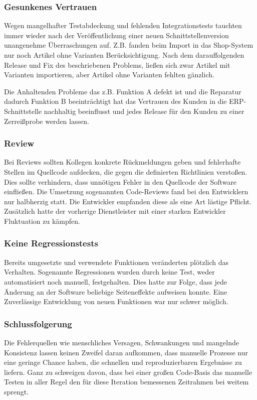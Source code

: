 \subsubsection{Gesunkenes Vertrauen}
Wegen mangelhafter Testabdeckung und fehlenden Integrationstests tauchten immer wieder nach der Veröffentlichung einer neuen Schnittstellenversion unangenehme Überraschungen auf. Z.B. fanden beim Import in das Shop-System nur noch Artikel ohne Varianten Berücksichtigung. Nach dem darauffolgenden Release und Fix des beschriebenen Problems, ließen sich zwar Artikel mit Varianten importieren, aber Artikel ohne Varianten fehlten gänzlich.

Die Anhaltenden Probleme das z.B. Funktion A defekt ist und die Reparatur dadurch Funktion B beeinträchtigt hat das Vertrauen des Kunden in die ERP-Schnittstelle nachhaltig beeinflusst und jedes Release für den Kunden zu einer Zerreißprobe werden lassen. 

\subsubsection{Review}
Bei Reviews sollten Kollegen konkrete Rückmeldungen geben und fehlerhafte Stellen im Quellcode aufdecken, die gegen die definierten Richtlinien verstoßen. Dies sollte verhindern, dass unnötigen Fehler in den Quellcode der Software einfließen. Die Umsetzung sogenannten Code-Reviews fand bei den Entwicklern nur halbherzig statt. Die Entwickler empfanden diese als eine Art lästige Pflicht. Zusätzlich hatte der vorherige Dienstleister mit einer starken Entwickler Fluktuation zu kämpfen. 

\subsubsection{Keine Regressionstests}
Bereits umgesetzte und verwendete Funktionen veränderten plötzlich das Verhalten. Sogenannte Regressionen wurden durch keine Test, weder automatisiert noch manuell, festgehalten. Dies hatte zur Folge, dass jede Änderung an der Software beliebige Seiteneffekte aufweisen konnte. Eine Zuverlässige Entwicklung von neuen Funktionen war nur schwer möglich.

\subsubsection{Schlussfolgerung}
Die Fehlerquellen wie menschliches Versagen, Schwankungen und mangelnde Konsistenz lassen keinen Zweifel daran aufkommen, dass manuelle Prozesse nur eine geringe Chance haben, die
schnellen und reproduzierbaren Ergebnisse zu liefern. Ganz zu schweigen davon, dass bei einer großen Code-Basis das manuelle Testen in aller Regel den für diese Iteration bemessenen Zeitrahmen
bei weitem sprengt.

